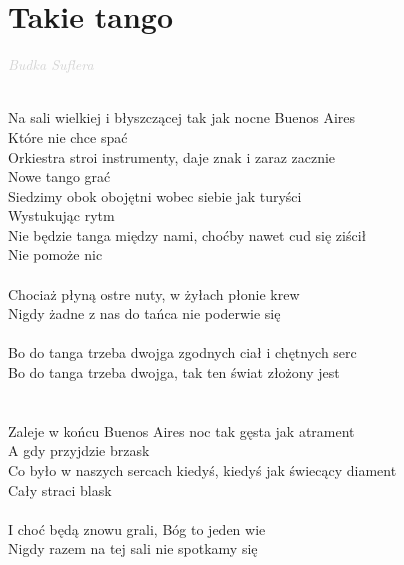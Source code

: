 \documentclass[a5paper, 10pt]{book}
\begin{document}
\section{Takie tango}\textcolor{lightgray}{\textit{Budka Suflera}}\\~\\
\begin{minipage}[t]{0.8\textwidth}
Na sali wielkiej i błyszczącej tak jak nocne Buenos Aires\\
Które nie chce spać \\
Orkiestra stroi instrumenty, daje znak i zaraz zacznie\\
Nowe tango grać\\
Siedzimy obok obojętni wobec siebie jak turyści\\
Wystukując rytm\\
Nie będzie tanga między nami, choćby nawet cud się ziścił\\
Nie pomoże nic\\
\\
\hspace*{3mm}Chociaż płyną ostre nuty, w żyłach płonie krew \\
\hspace*{3mm}Nigdy żadne z nas do tańca nie poderwie się\\
\\
\hspace*{6mm}Bo do tanga trzeba dwojga zgodnych ciał i chętnych serc\\
\hspace*{6mm}Bo do tanga trzeba dwojga, tak ten świat złożony jest\\
\\
\\
Zaleje w końcu Buenos Aires noc tak gęsta jak atrament\\
A gdy przyjdzie brzask\\
Co było w naszych sercach kiedyś, kiedyś jak świecący diament\\
Cały straci blask\\
\\
\hspace*{3mm}I choć będą znowu grali, Bóg to jeden wie\\
\hspace*{3mm}Nigdy razem na tej sali nie spotkamy się\\
\end{minipage}
\end{document}
